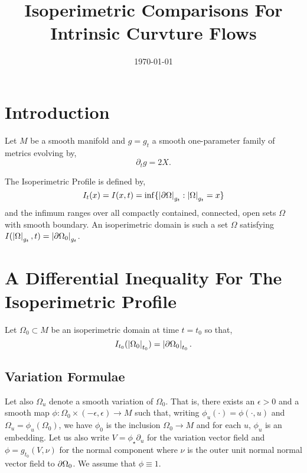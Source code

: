 \documentclass{amsart}
\begin{document}
\title[Isoperimetric Comparison]
 {Isoperimetric Comparisons For Intrinsic Curvture Flows}

\curraddr{}
\email{}
\date{\today}

\dedicatory{}
\subjclass[2010]{}
\keywords{}

\begin{abstract}
\end{abstract}

\maketitle

\section{Introduction}
\label{sec:intro}

Let \(M\) be a smooth manifold and \(g = g_t\) a smooth one-parameter family of metrics evolving by,
\begin{equation}
\label{eq:dtg}
\partial_t g = 2 X.
\end{equation}

The Isoperimetric Profile is defined by,
\[
I_t (x) = I(x, t) = \inf\{\left|{\partial {\Omega}}\right|_{g_t} : \left|{\Omega}\right|_{g_t} = x\}
\]
and the infimum ranges over all compactly contained, connected, open sets \(\Omega\) with smooth boundary. An isoperimetric domain is such a set \(\Omega\) satisfying \(I(\left|{\Omega}\right|_{g_t}, t) = \left|{\partial {\Omega_0}}\right|_{g_t}\).

\section{A Differential Inequality For The Isoperimetric Profile}
\label{sec:iso_diff_ineq}

Let \(\Omega_0 \subset M\) be an isoperimetric domain at time \(t = t_0\) so that,
\[
I_{t_0} (\left|{\Omega_0}\right|_{t_0}) = \left|{\partial {\Omega_0}}\right|_{t_0}.
\]

\subsection{Variation Formulae}
\label{subsec:iso_diff_ineq_variation}

Let also \(\Omega_u\) denote a smooth variation of \(\Omega_0\). That is, there exists an \(\epsilon > 0\) and a smooth map \(\phi: \Omega_0 \times (-\epsilon, \epsilon) \to M\) such that, writing \(\phi_u(\cdot) = \phi(\cdot, u)\) and \(\Omega_u = \phi_u(\Omega_0)\), we have \(\phi_0\) is the inclusion \(\Omega_0 \to M\) and for each \(u\), \(\phi_u\) is an embedding. Let us also write \(V = \phi_{\star} \partial_u\) for the variation vector field and \(\phi = g_{t_0} (V, \nu)\) for the normal component where \(\nu\) is the outer unit normal normal vector field to \(\partial {\Omega_0}\). We assume that \(\phi \equiv 1\).
\end{document}
